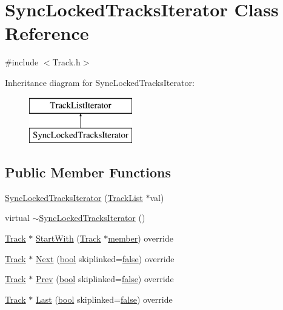 \hypertarget{class_sync_locked_tracks_iterator}{}\section{Sync\+Locked\+Tracks\+Iterator Class Reference}
\label{class_sync_locked_tracks_iterator}


{\ttfamily \#include $<$Track.\+h$>$}

Inheritance diagram for Sync\+Locked\+Tracks\+Iterator\+:\begin{figure}[H]
\begin{center}
\leavevmode
\includegraphics[height=2.000000cm]{class_sync_locked_tracks_iterator}
\end{center}
\end{figure}
\subsection*{Public Member Functions}
\begin{DoxyCompactItemize}
\item 
\hyperlink{class_sync_locked_tracks_iterator_a28cce8be57b5391496f39f6dbb487d0f}{Sync\+Locked\+Tracks\+Iterator} (\hyperlink{class_track_list}{Track\+List} $\ast$val)
\item 
virtual \hyperlink{class_sync_locked_tracks_iterator_ad1589bffe2630a031cf6bcb94b243bfd}{$\sim$\+Sync\+Locked\+Tracks\+Iterator} ()
\item 
\hyperlink{class_track}{Track} $\ast$ \hyperlink{class_sync_locked_tracks_iterator_aa53e5be7c38eca13ad9030c8e497164c}{Start\+With} (\hyperlink{class_track}{Track} $\ast$\hyperlink{xleval_8c_a3a669d2cc56c116777f0d573d8194e48}{member}) override
\item 
\hyperlink{class_track}{Track} $\ast$ \hyperlink{class_sync_locked_tracks_iterator_a09ddbd2c99421aa60ec63c1ec0ce3f51}{Next} (\hyperlink{mac_2config_2i386_2lib-src_2libsoxr_2soxr-config_8h_abb452686968e48b67397da5f97445f5b}{bool} skiplinked=\hyperlink{mac_2config_2i386_2lib-src_2libsoxr_2soxr-config_8h_a65e9886d74aaee76545e83dd09011727}{false}) override
\item 
\hyperlink{class_track}{Track} $\ast$ \hyperlink{class_sync_locked_tracks_iterator_a24604c1290e8ede5c306ead1b5054ea0}{Prev} (\hyperlink{mac_2config_2i386_2lib-src_2libsoxr_2soxr-config_8h_abb452686968e48b67397da5f97445f5b}{bool} skiplinked=\hyperlink{mac_2config_2i386_2lib-src_2libsoxr_2soxr-config_8h_a65e9886d74aaee76545e83dd09011727}{false}) override
\item 
\hyperlink{class_track}{Track} $\ast$ \hyperlink{class_sync_locked_tracks_iterator_ac9ce3caff468dfc78feaa008bdcb9783}{Last} (\hyperlink{mac_2config_2i386_2lib-src_2libsoxr_2soxr-config_8h_abb452686968e48b67397da5f97445f5b}{bool} skiplinked=\hyperlink{mac_2config_2i386_2lib-src_2libsoxr_2soxr-config_8h_a65e9886d74aaee76545e83dd09011727}{false}) override
\end{DoxyCompactItemize}
